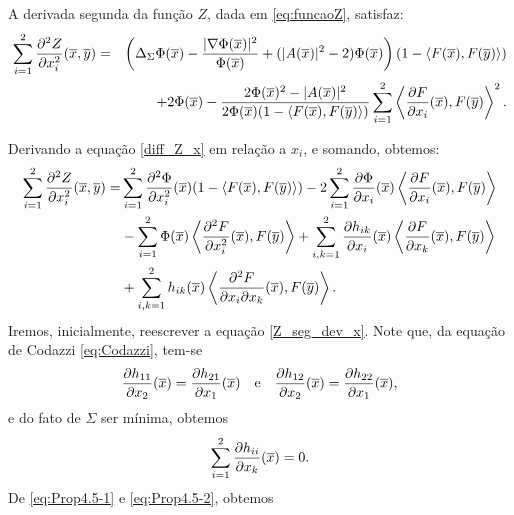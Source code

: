 \begin{proposicao}
A derivada segunda da fun\c c\~ao $Z$, dada em \eqref{eq:funcaoZ},
satisfaz:
\begin{eqnarray*}\label{2_diff_Z_x}
\sum_{i=1}^{2} \frac{\partial^2 Z}{\partial x_i^2} (\overline{x},\overline{y}) &=& 
\left( \Delta_{\Sigma} \Phi(\overline{x}) - \frac{| \nabla \Phi(\overline{x}) |^2}{\Phi(\overline{x})} 
+ (|A(\overline{x})|^2 - 2) \Phi(\overline{x}) \right) (1 - \left\langle F(\overline{x}), F(\overline{y}) \right\rangle) \\ 
&&+ 2 \Phi(\overline{x}) - \frac{2 \Phi(\overline{x})^2 - |A(\overline{x})|^2}{2 \Phi(\overline{x})
 (1 - \langle F(\overline{x}), F(\overline{y}) \rangle)} \sum_{i=1}^2 \left\langle 
 \frac{\partial F}{\partial x_i}(\overline{x}), F(\overline{y}) \right\rangle^2.
\end{eqnarray*}
\end{proposicao}
\begin{demonstracao}
Derivando a equação \eqref{diff_Z_x} em rela\c c\~ao a $x_i$,
e somando, obtemos:
\begin{eqnarray}\label{Z_seg_dev_x}
\begin{aligned}
\sum_{i=1}^2\frac{\partial^2 Z}{\partial x_i^2}(\overline{x},\overline{y}) = &
\sum_{i=1}^2\frac{\partial^2 \Phi}{\partial x_i^2}(\overline{x})
(1 - \langle F(\overline{x}), F(\overline{y}) \rangle) -
2\sum_{i=1}^2\frac{\partial \Phi}{\partial x_i}(\overline{x}) 
\left\langle \frac{\partial F}{\partial x_i}(\overline{x}), F(\overline{y}) \right\rangle \\
& - \sum_{i=1}^2\Phi(\overline{x}) \left\langle\frac{\partial^2 F}{\partial x_i^2}(\overline{x}),F(\overline{y})
\right\rangle + \sum_{i,k=1}^2\frac{\partial h_{ik}}{\partial x_i}(\overline{x})
\left\langle \frac{\partial F}{\partial x_k}(\overline{x}), F(\overline{y})\right\rangle \\ 
&+ \sum_{i,k=1}^2h_{ik}(\overline{x})\left\langle
\frac{\partial^2 F}{\partial x_i \partial x_k}(\overline{x}), F(\overline{y})\right\rangle.
\end{aligned}
\end{eqnarray}
Iremos, inicialmente, reescrever a equa\c c\~ao \eqref{Z_seg_dev_x}.
Note que, da equa\c c\~ao de Codazzi \eqref{eq:Codazzi}, tem-se
\begin{eqnarray}\label{eq:Prop4.5-1}
\frac{\partial h_{11}}{\partial x_2}(\overline{x}) = \frac{\partial h_{21}}{\partial x_1}(\overline{x})
\quad\mbox{e}\quad
\frac{\partial h_{12}}{\partial x_2}(\overline{x}) = \frac{\partial h_{22}}{\partial x_1}(\overline{x}),
\end{eqnarray}
e do fato de $\Sigma$ ser m\'inima, obtemos
\begin{eqnarray}\label{eq:Prop4.5-2}
\sum_{i=1}^2\frac{\partial h_{ii}}{\partial x_k}(\overline{x}) = 0.
\end{eqnarray}
De \eqref{eq:Prop4.5-1} e \eqref{eq:Prop4.5-2}, obtemos

\end{demonstracao}
